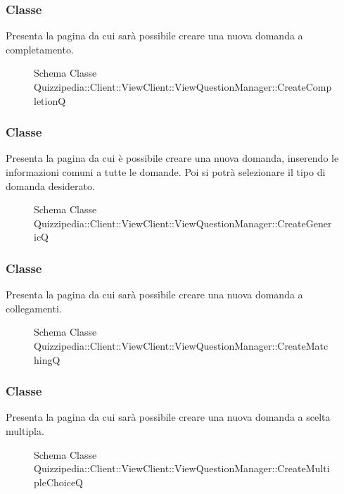 \subsubsection{Classe }
Presenta la pagina da cui sarà possibile creare una nuova domanda a completamento.
\begin{figure}[H]
\centering
\noindent{}
\caption[Schema Classe CreateCompletionQ]{Schema Classe Quizzipedia::Client::ViewClient::ViewQuestionManager::CreateCompletionQ}
\end{figure}
\subsubsection{Classe }
Presenta la pagina da cui è possibile creare una nuova domanda, inserendo le informazioni comuni a tutte le domande. Poi si potrà selezionare il tipo di domanda desiderato.
\begin{figure}[H]
\centering
\noindent{}
\caption[Schema Classe CreateGenericQ]{Schema Classe Quizzipedia::Client::ViewClient::ViewQuestionManager::CreateGenericQ}
\end{figure}
\subsubsection{Classe }
Presenta la pagina da cui sarà possibile creare una nuova domanda a collegamenti.
\begin{figure}[H]
\centering
\noindent{}
\caption[Schema Classe CreateMatchingQ]{Schema Classe Quizzipedia::Client::ViewClient::ViewQuestionManager::CreateMatchingQ}
\end{figure}
\subsubsection{Classe }
Presenta la pagina da cui sarà possibile creare una nuova domanda a scelta multipla.
\begin{figure}[H]
\centering
\noindent{}
\caption[Schema Classe CreateMultipleChoiceQ]{Schema Classe Quizzipedia::Client::ViewClient::ViewQuestionManager::CreateMultipleChoiceQ}
\end{figure}
